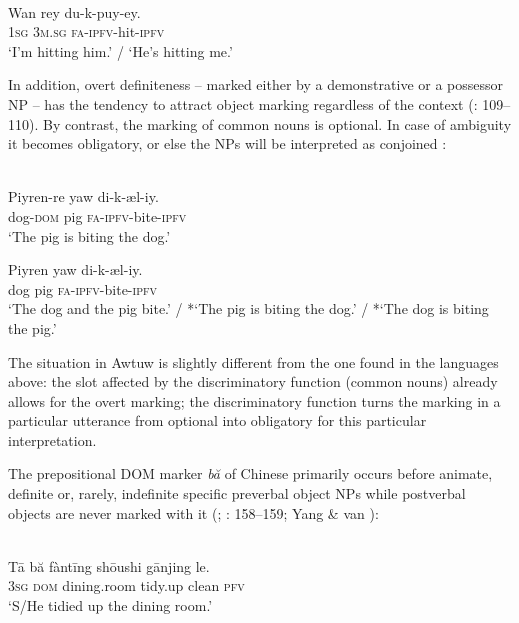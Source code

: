 \documentclass[output=paper]{langsci/langscibook}
\begin{document}
\ea\label{ex:serzant:}
\\
\gll *Wan   rey   du-k-puy-ey.\\
     \textsc{1sg}   \textsc{3m.sg}  \textsc{fa-ipfv}{}-hit-\textsc{ipfv}\\
 ‘I’m hitting him.’ / ‘He’s hitting me.’
\z

In addition, overt definiteness – marked either by a demonstrative or a possessor NP – has the tendency to attract object marking regardless of the context (\citealt{Feldman1986}: 109\-–110). By contrast, the marking of common nouns is optional. In case of ambiguity it becomes obligatory, or else the NPs will be interpreted as conjoined \citep[110]{Feldman1986}:

\ea\label{ex:serzant:}
\\
\ea
\gll Piyren-re  yaw  di-k-æl-iy.\\
     dog-\textsc{dom}  pig  \textsc{fa-ipfv}{}-bite-\textsc{ipfv}\\
\glt ‘The pig is biting the dog.’
\z

\ex
\gll Piyren  yaw  di-k-æl-iy.\\
     dog  pig  \textsc{fa-ipfv}{}-bite-\textsc{ipfv}\\
\glt ‘The dog and the pig bite.’ / *‘The pig is biting the dog.’ / *‘The dog is biting the pig.’
\z

The situation in Awtuw is slightly different from the one found in the languages above: the slot affected by the discriminatory function (common nouns) already allows for the overt marking; the discriminatory function turns the marking in a particular utterance from optional into obligatory for this particular interpretation.

The prepositional DOM marker \textit{bă} of Chinese primarily occurs before animate, definite or, rarely, indefinite specific preverbal object NPs while postverbal objects are never marked with it (\citealt{LiThompson1981}; \citealt{Bisang1992}: 158–159; Yang \& van \citealt{Bergen2007}):

\ea\label{ex:serzant:}
\\
\gll Tā   bă   fàntīng   shōushi   gānjing le.\\
     \textsc{3sg}  \textsc{dom}  dining.room   tidy.up   clean   \textsc{pfv}\\
\glt ‘S/He tidied up the dining room.’
\z
\end{document}
